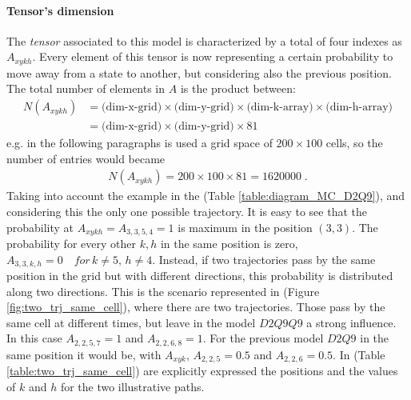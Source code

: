 \documentclass[class=article, crop=false]{standalone}
\begin{document}
\paragraph{Tensor's dimension}
The \emph{tensor} associated to this model is characterized by a total of four indexes as $A_{x y k h}$.
Every element of this tensor is now representing a certain probability to move away from a state to another, but considering also the previous position.
The total number of elements in $A$ is the product between:
\begin{equation*}
\begin{split}
N(A_{xykh}) &= \mbox{(dim-x-grid)} \times \mbox{(dim-y-grid)} \times \mbox{(dim-k-array)} \times \mbox{(dim-h-array)} \\
& = \mbox{(dim-x-grid)} \times \mbox{(dim-y-grid)} \times 81
\end{split}
\end{equation*}
e.g. in the following paragraphs is used a grid space of $200\times100$ cells, so the number of entries would became 
\begin{equation*}
\begin{split}
N(A_{xykh})=200\times100\times 81 = 1620000 \; .
\end{split}
\end{equation*}
Taking into account the example in the (Table \ref{table:diagram_MC_D2Q9}), and considering this the only one possible trajectory.
It is easy to see that the probability at $A_{x y k h} = A_{3, 3, 5, 4} = 1$ is maximum in the position $(3, 3)$.
The probability for every other $k, h$ in the same position is zero, $A_{3, 3, k, h} = 0 \quad for \, k \neq 5, \, h \neq 4$.
Instead, if two trajectories pass by the same position in the grid but with different directions, this probability is distributed along two directions.
This is the scenario represented in (Figure \ref{fig:two_trj_same_cell}), where there are two trajectories.
Those pass by the same cell at different times, but leave in the model $D2Q9Q9$ a strong influence.
In this case $A_{2, 2, 5, 7} = 1$ and $A_{2, 2, 6, 8} = 1$.
For the previous model $D2Q9$ in the same position it would be, with $A_{x y k}$, $A_{2, 2, 5} = 0.5$ and $A_{2, 2, 6} = 0.5$.
In (Table \ref{table:two_trj_same_cell}) are explicitly expressed the positions and the values of $k$ and $h$ for the two illustrative paths.
\end{document}

